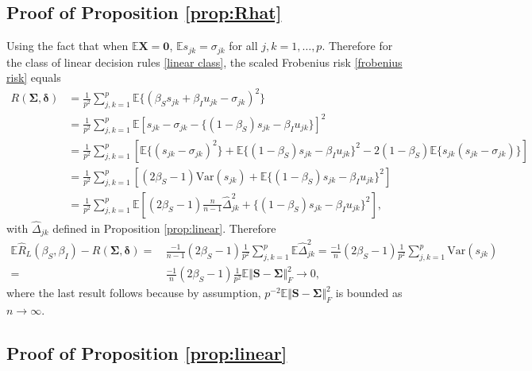 \documentclass{article}
\def\bs{\mathbf}
\def\bb{\mathbb}
\begin{document}
\subsection{Proof of Proposition \ref{prop:Rhat}}
Using the fact that when $\bb{E}\bs{X}=\bs{0}$, $\bb{E}s_{jk} = \sigma_{jk}$ for all $j,k=1,\ldots,p$. Therefore for the class of linear decision rules \eqref{linear class}, the scaled Frobenius risk \eqref{frobenius risk} equals
\begin{align*}
R(\bs{\Sigma}, \bs{\delta}) &=\frac{1}{p^2}\sum_{j,k=1}^p \bb{E} \{ (\beta_{S}s_{jk}+\beta_Iu_{jk}-\sigma_{jk})^2 \} \\
& =\frac{1}{p^2}\sum_{j,k=1}^p \bb{E} [s_{jk}-\sigma_{jk} - \{(1-\beta_{S})s_{jk}-\beta_Iu_{jk}\}]^2\\
& =\frac{1}{p^2}\sum_{j,k=1}^p [\bb{E}\{(s_{jk}-\sigma_{jk})^2\}+ \bb{E}\{(1-\beta_{S})s_{jk}-\beta_Iu_{jk}\}^2-2(1-\beta_{S})\bb{E}\{s_{jk}(s_{jk}-\sigma_{jk})\}]\\
& =\frac{1}{p^2}\sum_{j,k=1}^p [(2\beta_{S}-1)\text{Var}(s_{jk})+\bb{E}\{(1-\beta_{S})s_{jk}-\beta_Iu_{jk}\}^2] \\
& =\frac{1}{p^2}\sum_{j,k=1}^p\bb{E}[(2\beta_S-1)\frac{n}{n-1}\hat{\Delta}_{jk}^2+\{(1-\beta_{S})s_{jk}-\beta_Iu_{jk}\}^2],
\end{align*}
with $\hat{\Delta}_{jk}$ defined in Proposition \ref{prop:linear}. Therefore
\begin{align*}
  \bb{E} \hat{R}_L(\beta_S, \beta_I) - R(\bs{\Sigma}, \bs{\delta})
  =\,&
       \frac{-1}{n - 1} (2\beta_S-1) \frac{1}{p^2} \sum_{j,k=1}^{p}\bb{E}\hat{\Delta}_{jk}^2
       =
       \frac{-1}{n} (2\beta_S-1) \frac{1}{p^2} \sum_{j,k=1}^{p} \text{Var}(s_{jk}) \\
  =\,&
       \frac{-1}{n} (2\beta_S-1) \frac{1}{p^2} \bb{E} \Vert \bs{S} - \bs{\Sigma} \Vert_F^2
  \rightarrow 0,
\end{align*}
where the last result follows because by assumption, $p^{-2} \bb{E} \Vert \bs{S} - \bs{\Sigma} \Vert_F^2$ is bounded as $n \rightarrow \infty$.

\subsection{Proof of Proposition \ref{prop:linear}}

\end{document}
